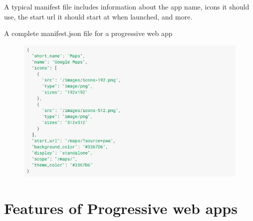 \documentclass[14pt,a4paper,final]{extreport}
\begin{document}
A typical manifest file includes information about the app name, icons it should use, the start url it should start at when launched, and more.
\item A complete manifest.json file for a progressive web app
\begin{figure}[h]
		\includegraphics[scale=.7]{s2.jpeg}
	
    
\end{figure}

\chapter{Features of Progressive web apps}
\end{document}
